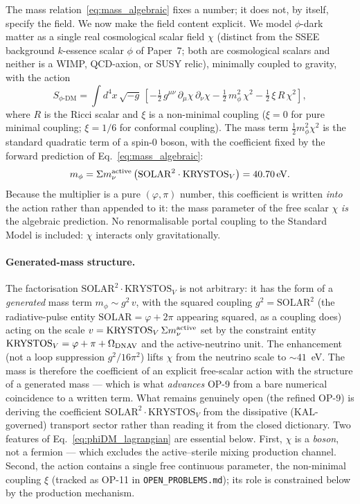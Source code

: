 \documentclass[12pt,a4paper]{article}
\newcommand{\phiDM}{\phi\text{-DM}}
\newcommand{\mphi}{m_\phi}
\newcommand{\mnu}{\Sigma m_\nu}
\begin{document}
The mass relation~\eqref{eq:mass_algebraic} fixes a number; it does not, by
itself, specify the field.  We now make the field content explicit.
We model $\phi$-dark matter as a single real cosmological scalar field $\chi$
(distinct from the SSEE background $k$-essence scalar $\phi$ of Paper~7; both
are cosmological scalars and neither is a WIMP, QCD-axion, or SUSY relic),
minimally coupled to gravity, with the action
\begin{equation}
  S_{\phiDM} = \int d^4x\,\sqrt{-g}\,
    \left[
      -\tfrac{1}{2}\,g^{\mu\nu}\,\partial_\mu\chi\,\partial_\nu\chi
      -\tfrac{1}{2}\,\mphi^2\,\chi^2
      -\tfrac{1}{2}\,\xi\,R\,\chi^2
    \right],
  \label{eq:phiDM_lagrangian}
\end{equation}
where $R$ is the Ricci scalar and $\xi$ is a non-minimal coupling
($\xi = 0$ for pure minimal coupling; $\xi = 1/6$ for conformal coupling).
The mass term $\tfrac{1}{2}\mphi^2\chi^2$ is the standard quadratic term of a
spin-0 boson, with the coefficient fixed by the forward prediction of
Eq.~\eqref{eq:mass_algebraic}:
\begin{equation}
  \mphi = \mnu^{\rm active}\,
          \bigl(\mathrm{SOLAR}^2\cdot\mathrm{KRYSTOS}_V\bigr) = 40.70\,\mathrm{eV}.
  \label{eq:mass_coeff}
\end{equation}
Because the multiplier is a pure $(\varphi,\pi)$ number, this coefficient is
written \emph{into} the action rather than appended to it: the mass parameter of
the free scalar $\chi$ \emph{is} the algebraic prediction.  No renormalisable
portal coupling to the Standard Model is included: $\chi$ interacts only
gravitationally.

\paragraph{Generated-mass structure.}
The factorisation $\mathrm{SOLAR}^2\cdot\mathrm{KRYSTOS}_V$ is not arbitrary: it has
the form of a \emph{generated} mass term $\mphi \sim g^2\,v$, with the squared
coupling $g^2 = \mathrm{SOLAR}^2$ (the radiative-pulse entity $\mathrm{SOLAR}=
\varphi+2\pi$ appearing squared, as a coupling does) acting on the scale
$v = \mathrm{KRYSTOS}_V\,\mnu^{\rm active}$ set by the constraint entity
$\mathrm{KRYSTOS}_V=\varphi+\pi+\Omega_{\rm DNAV}$ and the active-neutrino unit. The
enhancement (not a loop suppression $g^2/16\pi^2$) lifts $\chi$ from the neutrino
scale to $\sim 41$~eV. The mass is therefore the coefficient of an explicit
free-scalar action with the structure of a generated mass --- which is what
\emph{advances} OP-9 from a bare numerical coincidence to a written term. What
remains genuinely open (the refined OP-9) is deriving the coefficient
$\mathrm{SOLAR}^2\cdot\mathrm{KRYSTOS}_V$ from the dissipative ($\mathrm{KAL}$-governed)
transport sector rather than reading it from the closed dictionary.
Two features of Eq.~\eqref{eq:phiDM_lagrangian} are essential below.
First, $\chi$ is a \emph{boson}, not a fermion --- which excludes the
active--sterile mixing production channel.
Second, the action contains a single free continuous parameter, the
non-minimal coupling $\xi$ (tracked as OP-11 in
\texttt{OPEN\_PROBLEMS.md}); its role is constrained below by the production
mechanism.
\end{document}
